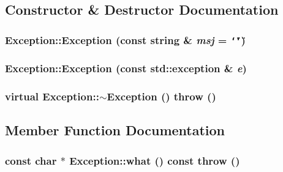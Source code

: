 \subsection{Constructor \& Destructor Documentation}
\hypertarget{classException_dfdfbffc77f1a57f6b338817ddac3b5e}{
\subsubsection[{Exception}]{\setlength{\rightskip}{0pt plus 5cm}Exception::Exception (const string \& {\em msj} = {\tt \char`\"{}\char`\"{}})}}
\label{classException_dfdfbffc77f1a57f6b338817ddac3b5e}


\hypertarget{classException_843d2598ec9818ebeeebee3cafecaf0e}{
\subsubsection[{Exception}]{\setlength{\rightskip}{0pt plus 5cm}Exception::Exception (const std::exception \& {\em e})}}
\label{classException_843d2598ec9818ebeeebee3cafecaf0e}


\hypertarget{classException_d1ba411de295ef2eeb02ba26284a829a}{
\subsubsection[{$\sim$Exception}]{\setlength{\rightskip}{0pt plus 5cm}virtual Exception::$\sim$Exception ()  throw ()}}
\label{classException_d1ba411de295ef2eeb02ba26284a829a}




\subsection{Member Function Documentation}
\hypertarget{classException_380f0477d9ef319911e7a8167bd47f1f}{
\subsubsection[{what}]{\setlength{\rightskip}{0pt plus 5cm}const char $\ast$ Exception::what () const  throw ()}}
\label{classException_380f0477d9ef319911e7a8167bd47f1f}





